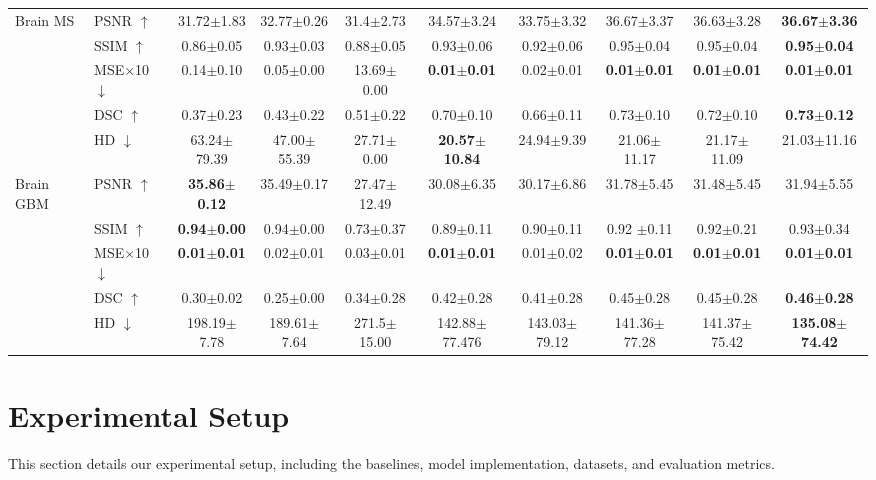 \documentclass[twoside]{article}
\begin{document}
\begin{table}[t!]
{\begin{tabular}{llcccccccc}
\multirow{5}{*}{Brain MS} 
  & PSNR $\uparrow$ & 31.72$\pm$1.83 & 32.77$\pm$0.26 & 31.4$\pm$2.73 & 34.57$\pm$3.24 & 33.75$\pm$3.32 & 36.67$\pm$3.37 & 36.63$\pm$3.28 & \textbf{36.67$\pm$3.36} \\
  & SSIM $\uparrow$ & 0.86$\pm$0.05 & 0.93$\pm$0.03 & 0.88$\pm$0.05 & 0.93$\pm$0.06& 0.92$\pm$0.06 & 0.95$\pm$0.04 & 0.95$\pm$0.04 & \textbf{0.95$\pm$0.04} \\
  & MSE$\times$10~$\downarrow$ & 0.14$\pm$0.10 & 0.05$\pm$0.00 & 13.69$\pm$0.00 & \textbf{0.01$\pm$0.01} & 0.02$\pm$0.01 & \textbf{0.01$\pm$0.01}  & \textbf{0.01$\pm$0.01} & \textbf{0.01$\pm$0.01}\\
  & DSC  $\uparrow$ & 0.37$\pm$0.23 & 0.43$\pm$0.22 & 0.51$\pm$0.22 &  0.70$\pm$0.10 & 0.66$\pm$0.11 & 0.73$\pm$0.10 & 0.72$\pm$0.10  & \textbf{0.73$\pm$0.12}\\
  & HD   $\downarrow$ & 63.24$\pm$79.39 & 47.00$\pm$55.39 & 27.71$\pm$0.00  & \textbf{20.57$\pm$10.84} & 24.94$\pm$9.39 & 21.06$\pm$11.17 & 21.17$\pm$11.09 & 21.03$\pm$11.16\\
 \midrule
    \multirow{5}{*}{Brain GBM}
      & PSNR $\uparrow$ & \textbf{35.86$\pm$0.12} & 35.49$\pm$0.17 & 27.47$\pm$12.49 & 30.08$\pm$6.35 & 30.17$\pm$6.86 & 31.78$\pm$5.45 & 31.48$\pm$5.45 & 31.94$\pm$5.55 \\
      & SSIM $\uparrow$ & \textbf{0.94$\pm$0.00} & 0.94$\pm$0.00 & 0.73$\pm$0.37 & 0.89$\pm$0.11  & 0.90$\pm$0.11 & 0.92 $\pm$0.11  & 0.92$\pm$0.21 & 0.93$\pm$0.34 \\
      & MSE$\times$10~$\downarrow$ & \textbf{0.01$\pm$0.01} & 0.02$\pm$0.01 & 0.03$\pm$0.01 & \textbf{0.01$\pm$0.01}  & 0.01$\pm$0.02 & \textbf{0.01$\pm$0.01}  & \textbf{0.01$\pm$0.01} & \textbf{0.01$\pm$0.01}\\
      & DSC  $\uparrow$ & 0.30$\pm$0.02 & 0.25$\pm$0.00 & 0.34$\pm$0.28 & 0.42$\pm$0.28  & 0.41$\pm$0.28 & 0.45$\pm$0.28 & 0.45$\pm$0.28 & \textbf{0.46$\pm$0.28}\\
      & HD   $\downarrow$ & 198.19$\pm$7.78 & 189.61$\pm$7.64 & 271.5$\pm$15.00 & 142.88$\pm$77.476  & 143.03$\pm$79.12 & 141.36$\pm$77.28 & 141.37$\pm$75.42 & \textbf{135.08$\pm$74.42}\\
    \bottomrule
  \end{tabular}}
\end{table}


\section{Experimental Setup}
This section details our experimental setup, including the baselines, model implementation, datasets, and evaluation metrics.
\end{document}
